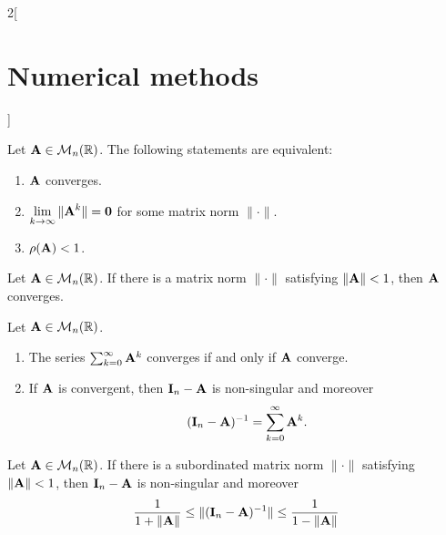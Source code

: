 \documentclass[../../../main.tex]{subfiles}
\begin{document}
\begin{multicols}{2}[\section{Numerical methods}]
\begin{theorem}
    Let $\vb{A}\in\mathcal{M}_n(\mathbb{R})$. The following statements are equivalent:
    \begin{enumerate}
        \item $\vb{A}$ converges.
        \item $\displaystyle\lim_{k\to\infty}\|\vb{A}^k\|=\vb{0}$ for some matrix norm $\|\cdot\|$.
        \item $\rho(\vb{A})<1$.
    \end{enumerate}
\end{theorem}
\begin{corollary}
    Let $\vb{A}\in\mathcal{M}_n(\mathbb{R})$. If there is a matrix norm $\|\cdot\|$ satisfying $\|\vb{A}\|<1$, then $\vb{A}$ converges.
\end{corollary}
\begin{theorem}
    Let $\vb{A}\in\mathcal{M}_n(\mathbb{R})$.
    \begin{enumerate}
        \item The series $\sum_{k=0}^\infty \vb{A}^k$ converges if and only if $\vb{A}$ converge.
        \item If $\vb{A}$ is convergent, then $\vb{I}_n-\vb{A}$ is non-singular and moreover $$(\vb{I}_n-\vb{A})^{-1}=\sum_{k=0}^\infty\vb{A}^k.$$
    \end{enumerate}
\end{theorem}
\begin{corollary}
    Let $\vb{A}\in\mathcal{M}_n(\mathbb{R})$. If there is a subordinated matrix norm $\|\cdot\|$ satisfying $\|\vb{A}\|<1$, then $\vb{I}_n-\vb{A}$ is non-singular and moreover $$\frac{1}{1+\|\vb{A}\|}\leq\|(\vb{I}_n-\vb{A})^{-1}\|\leq\frac{1}{1-\|\vb{A}\|}$$
\end{corollary}

\end{multicols}
\end{document}
